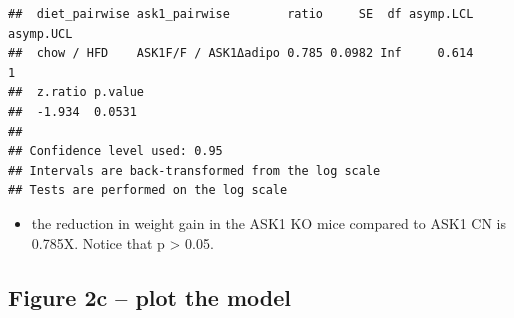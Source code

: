 \documentclass[]{book}
\providecommand{\tightlist}{%
  \setlength{\itemsep}{0pt}\setlength{\parskip}{0pt}}
\begin{document}
\begin{verbatim}
##  diet_pairwise ask1_pairwise        ratio     SE  df asymp.LCL asymp.UCL
##  chow / HFD    ASK1F/F / ASK1Δadipo 0.785 0.0982 Inf     0.614         1
##  z.ratio p.value
##  -1.934  0.0531 
## 
## Confidence level used: 0.95 
## Intervals are back-transformed from the log scale 
## Tests are performed on the log scale
\end{verbatim}

\begin{itemize}
\tightlist
\item
  the reduction in weight gain in the ASK1 KO mice compared to ASK1 CN is 0.785X. Notice that p \textgreater{} 0.05.
\end{itemize}

\hypertarget{figure-2c-plot-the-model}{%
\subsection{Figure 2c -- plot the model}\label{figure-2c-plot-the-model}}
\end{document}
